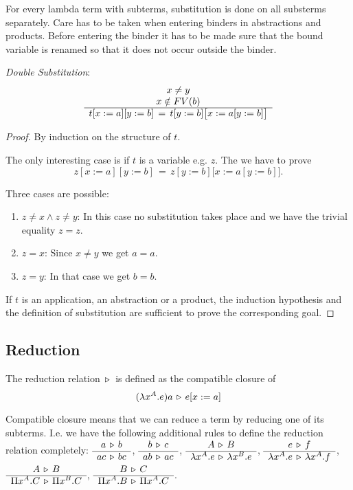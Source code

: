 For every lambda term with subterms, substitution is done on all substerms
separately. Care has to be taken when entering binders in abstractions and
products. Before entering the binder it has to be made sure that the bound
variable is renamed so that it does not occur outside the binder.


\begin{lemma}
  \label{doublesubstitution}
  \emph{Double Substitution}:
  $$
  \begin{array}{c} x \neq y
    \\
    x \notin FV(b)
   \\ \hline t[x:=a][y:=b]\, = \, t[y:=b]\big[x:=a[y:=b]\big]\end{array}
  $$
  \begin{proof}
    By induction on the structure of $t$.

    The only interesting case is if $t$ is a variable e.g. $z$. The we have to
    prove
    $$ z[x:=a][y:=b]\, = \, z[y:=b]\big[x:=a[y:=b]\big].$$

    Three cases are possible:
    \begin{enumerate}
    \item
      $z \ne x \land z \ne y$: In this case no substitution takes place and we
      have the trivial equality $z = z$.

    \item $z = x$: Since $x \ne y$ we get $a = a$.

    \item $z = y$: In that case we get $b = b$.
    \end{enumerate}

    If $t$ is an application, an abstraction or a product, the induction
    hypothesis and the definition of substitution are sufficient to prove the
    corresponding goal.
  \end{proof}
\end{lemma}





\subsection{Reduction}

\begin{definition}
  The reduction relation $\,\triangleright\,$ is defined as the compatible closure
  of
  $$
  (\lambda x^A. e) a \,\triangleright\, e[x:=a]
  $$
\end{definition}

Compatible closure means that we can reduce a term by reducing one of its
subterms. I.e. we have the following additional rules to define the reduction
relation completely: $\begin{array}{c} a \,\triangleright\, b \\ \hline ac \,\triangleright\, bc\end{array}$,
$\begin{array}{c} b \,\triangleright\, c \\ \hline ab \,\triangleright\, ac\end{array}$,
$\begin{array}{c} A \,\triangleright\, B \\ \hline \lambda x^A.e \,\triangleright\, \lambda x^B. e\end{array}$,
$\begin{array}{c} e \,\triangleright\, f \\ \hline \lambda x^A.e \,\triangleright\, \lambda x^A. f\end{array}$,
$\begin{array}{c} A \,\triangleright\, B \\ \hline \Pi x^A.C \,\triangleright\, \Pi x^B. C\end{array}$,
$\begin{array}{c} B \,\triangleright\, C \\ \hline \Pi x^A.B \,\triangleright\, \Pi x^A. C\end{array}$.



